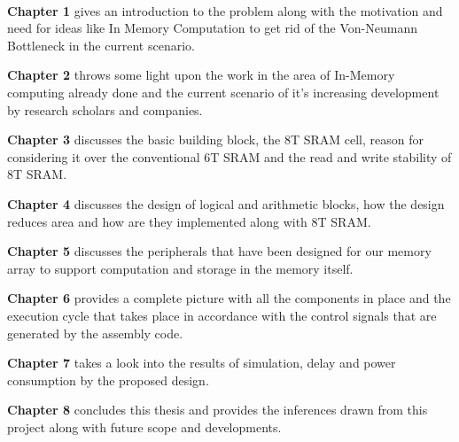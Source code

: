 \paragraph{}
\textbf{Chapter 1} gives an introduction to the problem along with the motivation and need for ideas like In Memory Computation to get rid of the Von-Neumann Bottleneck in the current scenario.

\textbf{Chapter 2} throws some light upon the work in the area of In-Memory computing already done and the current scenario of it's increasing development by research scholars and companies. 

\textbf{Chapter 3} discusses the basic building block, the 8T SRAM cell, reason for considering it over the conventional 6T SRAM and the read and write stability of 8T SRAM.

\textbf{Chapter 4} discusses the design of logical and arithmetic blocks, how the design reduces area and how are they implemented along with 8T SRAM.

\textbf{Chapter 5} discusses the peripherals that have been designed for our memory array to support computation and storage in the memory itself.

\textbf{Chapter 6}  provides a complete picture with all the components in place and the execution cycle that takes place in accordance with the control signals that are generated by the assembly code.

\textbf{Chapter 7}  takes a look into the results of simulation, delay and power consumption by the proposed design.

\textbf{Chapter 8}  concludes this thesis and provides the inferences drawn from this project along with future scope and developments.


